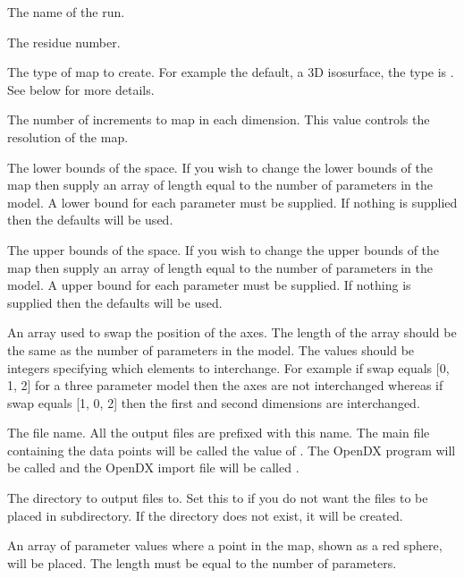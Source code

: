   The name of the run.

  The residue number.

  The type of map  to create.  For example the default, a 3D isosurface, the type is 
.  See below for more details.

  The number of increments to map  in each dimension.  This value controls the resolution of the map. 

  The lower bounds  of the space.  If you wish to change the lower bounds  of the map  then supply an array of length equal to the number of parameters in the model.  A lower bound  for each parameter must be supplied.  If nothing is supplied then the defaults will be used.

  The upper bounds  of the space.  If you wish to change the upper bounds  of the map  then supply an array of length equal to the number of parameters in the model.  A upper bound  for each parameter must be supplied.  If nothing is supplied then the defaults will be used.

  An array used to swap the position of the axes.  The length of the array should be the same as the number of parameters in the model.  The values should be integers specifying which elements to interchange.  For example if swap equals [0, 1, 2] for a three parameter model then the axes are not interchanged whereas if swap equals [1, 0, 2] then the first and second dimensions are interchanged.

  The file name.  All the output files are prefixed with this name.  The main file containing the data points will be called the value of 
.  The OpenDX  program will be called 
 and the OpenDX  import file will be called 
.

  The directory to output files to.  Set this to 
 if you do not want the files to be placed in subdirectory.  If the directory does not exist, it will be created.

  An array of parameter values where a point in the map,  shown as a red sphere,  will be placed.  The length must be equal to the number of parameters.

